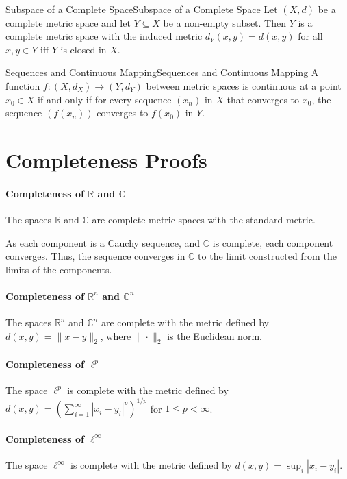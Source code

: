 \documentclass[../main.tex]{subfiles}
\begin{document}
\begin{theorem}{Subspace of a Complete Space}{Subspace of a Complete Space}
	Let $(X, d)$ be a complete metric space and let $Y \subseteq X$ be a non-empty subset. Then $Y$ is a complete metric space with the induced metric $d_Y(x, y) = d(x, y)$ for all $x, y \in Y$ iff $Y$ is closed in $X$.
\end{theorem}

\begin{theorem}{Sequences and Continuous Mapping}{Sequences and Continuous Mapping}
	A function $f: (X, d_X) \to (Y, d_Y)$ between metric spaces is continuous at a point $x_0 \in X$ if and only if for every sequence $(x_n)$ in $X$ that converges to $x_0$, the sequence $(f(x_n))$ converges to $f(x_0)$ in $Y$.
\end{theorem}

\section{Completeness Proofs}
\paragraph{Completeness of $\mathbb{R}$ and $\mathbb{C}$} The spaces $\mathbb{R}$ and $\mathbb{C}$ are complete metric spaces with the standard metric.

As each component is a Cauchy sequence, and $\mathbb{C}$ is complete, each component converges. Thus, the sequence converges in $\mathbb{C}$ to the limit constructed from the limits of the components.

\paragraph{Completeness of $\mathbb{R}^n$ and $\mathbb{C}^n$} The spaces $\mathbb{R}^n$ and $\mathbb{C}^n$ are complete with the metric defined by $d(x, y) = \|x - y\|_2$, where $\| \cdot \|_2$ is the Euclidean norm.

\paragraph{Completeness of $\ell^p$} The space $\ell^p$ is complete with the metric defined by $\displaystyle d(x, y) = \left( \sum_{i=1}^\infty |x_i - y_i|^p \right)^{1/p}$ for $1 \leq p < \infty$.

\paragraph{Completeness of $\ell^{\infty }$} The space $\ell^{\infty }$ is complete with the metric defined by $d(x, y) = \sup_{i} |x_i - y_i|$.
\end{document}
